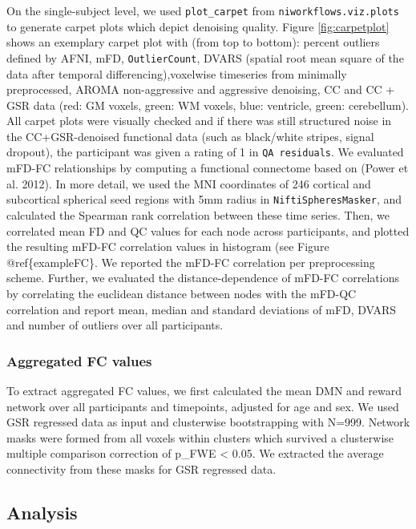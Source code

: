\documentclass[
]{article}
\begin{document}
On the single-subject level, we used \texttt{plot\_carpet} from \texttt{niworkflows.viz.plots} to generate carpet plots which depict denoising quality. Figure \ref{fig:carpetplot} shows an exemplary carpet plot with (from top to bottom): percent outliers defined by AFNI, mFD, \texttt{OutlierCount}, DVARS (spatial root mean square of the data after temporal differencing),voxelwise timeseries from minimally preprocessed, AROMA non-aggressive and aggressive denoising, CC and CC + GSR data (red: GM voxels, green: WM voxels, blue: ventricle, green: cerebellum). All carpet plots were visually checked and if there was still structured noise in the CC+GSR-denoised functional data (such as black/white stripes, signal dropout), the participant was given a rating of 1 in \texttt{QA\ residuals}.
We evaluated mFD-FC relationships by computing a functional connectome based on (Power et al. 2012). In more detail, we used the MNI coordinates of 246 cortical and subcortical spherical seed regions with 5mm radius in \texttt{NiftiSpheresMasker}, and calculated the Spearman rank correlation between these time series. Then, we correlated mean FD and QC values for each node across participants, and plotted the resulting mFD-FC correlation values in histogram (see Figure @ref\{exampleFC\}. We reported the mFD-FC correlation per preprocessing scheme.
Further, we evaluated the distance-dependence of mFD-FC correlations by correlating the euclidean distance between nodes with the mFD-QC correlation and report mean, median and standard deviations of mFD, DVARS and number of outliers over all participants.

\hypertarget{aggregated-fc-values}{%
\subsubsection{Aggregated FC values}\label{aggregated-fc-values}}

To extract aggregated FC values, we first calculated the mean DMN and reward network over all participants and timepoints, adjusted for age and sex. We used GSR regressed data as input and clusterwise bootstrapping with N=999. Network masks were formed from all voxels within clusters which survived a clusterwise multiple comparison correction of p\_FWE \textless{} 0.05. We extracted the average connectivity from these masks for GSR regressed data.

\hypertarget{analysis}{%
\subsection{Analysis}\label{analysis}}
\end{document}
